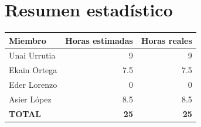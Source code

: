 \documentclass[12pt, a4paper]{article}
\begin{document}
\vspace{1.5em}

\section{Resumen estadístico}

\begin{center}
    \begin{tabular}{|l|r|r|}
        \hline
        \textbf{Miembro} & \textbf{Horas estimadas} & \textbf{Horas reales} \\
        \hline
        Unai Urrutia & 9 & 9 \\
        \hline
        Ekain Ortega & 7.5 & 7.5 \\
        \hline
        Eder Lorenzo & 0 & 0 \\
        \hline
        Asier López & 8.5 & 8.5 \\
        \hline
        \textbf{TOTAL} & \textbf{25} & \textbf{25} \\
        \hline
    \end{tabular}
\end{center}
\end{document}
